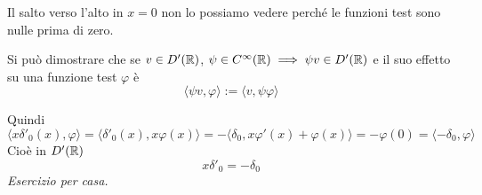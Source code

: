 Il salto verso l'alto in $x=0$ non lo possiamo vedere perché le funzioni test sono nulle prima di zero.
\Soluzione
\begin{rem}
Si può dimostrare che se $v\in D'(\mathbb{R} )$, $\psi \in C^{\infty }(\mathbb{R} ) \implies \psi v\in D'(\mathbb{R} )$ e il suo effetto su una funzione test $\varphi $ è
\begin{equation*}
\langle \psi v,\varphi \rangle :=\langle v,\psi \varphi \rangle 
\end{equation*}
\end{rem}
Quindi
\begin{equation*}
\langle x\delta '_{0} (x),\varphi \rangle =\langle \delta '_{0} (x),x\varphi ( x) \rangle =-\langle \delta _{0} ,x\varphi '( x) +\varphi ( x) \rangle =-\varphi ( 0) =\langle -\delta _{0} ,\varphi \rangle 
\end{equation*}
Cioè in $D'(\mathbb{R} )$
\begin{equation*}
x\delta '_{0} =-\delta _{0}
\end{equation*}
\textit{Esercizio per casa.}

